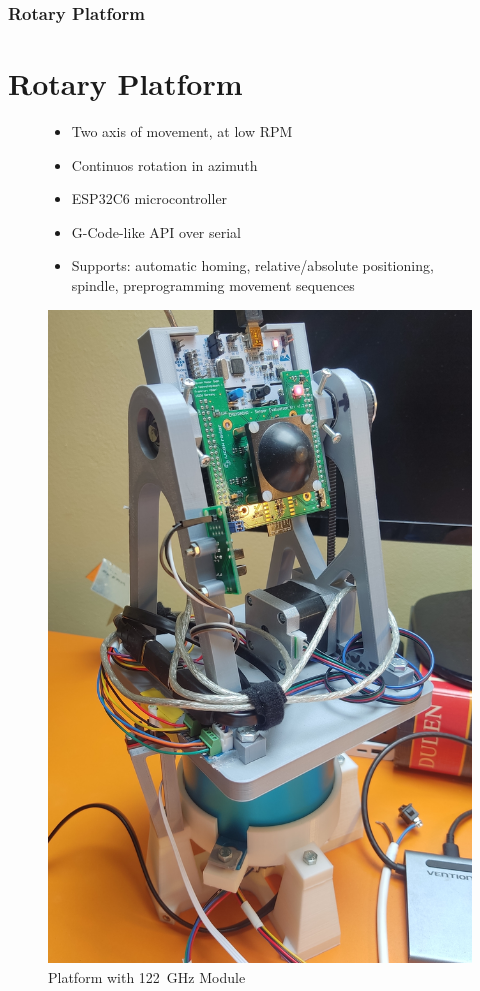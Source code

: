 \documentclass[aspectratio=169]{beamer}
\begin{document}
\begin{frame}[fragile]
  \frametitle{Rotary Platform}
  \section{Rotary Platform}
  \begin{figure}[!htb]
    \begin{minipage}{0.48\textwidth}
      \begin{itemize}
        \item Two axis of movement, at low RPM
				\item Continuos rotation in azimuth
        \item ESP32C6 microcontroller
        \item G-Code-like API over serial
        \item Supports: automatic homing, relative/absolute positioning, spindle, preprogramming movement sequences
      \end{itemize}
    \end{minipage}\hfill
    \begin{minipage}{0.48\textwidth}
      \centering
      \includegraphics[width=.6\linewidth]{../img/assembly_photo.jpg}
      \caption{Platform with 122~GHz Module}
    \end{minipage}
  \end{figure}
\end{frame}
\end{document}
